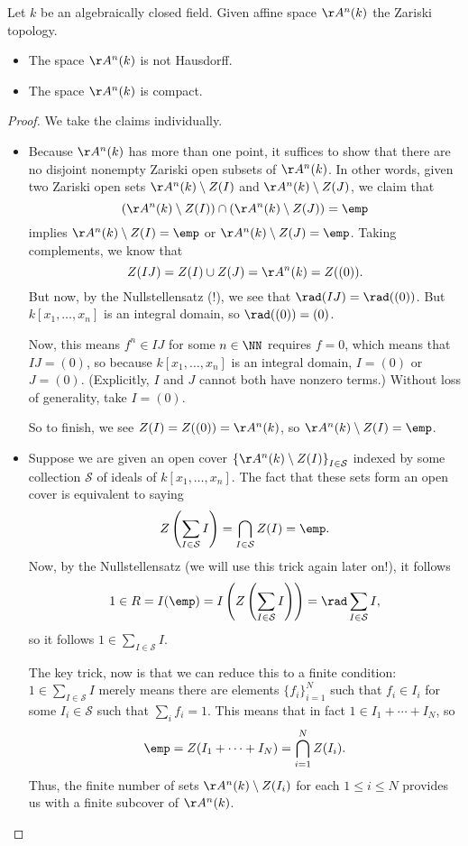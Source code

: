 \begin{proposition}
	Let $k$ be an algebraically closed field. Given affine space $\AA^n(k)$ the Zariski topology.
	\begin{itemize}
		\item The space $\AA^n(k)$ is not Hausdorff.
		\item The space $\AA^n(k)$ is compact.
	\end{itemize}
\end{proposition}
\begin{proof}
	We take the claims individually.
	\begin{itemize}
		\item Because $\AA^n(k)$ has more than one point, it suffices to show that there are no disjoint nonempty Zariski open subsets of $\AA^n(k)$. In other words, given two Zariski open sets $\AA^n(k)\setminus Z(I)$ and $\AA^n(k)\setminus Z(J)$, we claim that
		\[\left(\AA^n(k)\setminus Z(I)\right)\cap\left(\AA^n(k)\setminus Z(J)\right)=\emp\]
		implies $\AA^n(k)\setminus Z(I)=\emp$ or $\AA^n(k)\setminus Z(J)=\emp$. Taking complements, we know that
		\[Z(IJ)=Z(I)\cup Z(J)=\AA^n(k)=Z((0)).\]
		But now, by the Nullstellensatz (!), we see that $\rad(IJ)=\rad((0))$. But $k[x_1,\ldots,x_n]$ is an integral domain, so $\rad((0))=(0)$.
		
		Now, this means $f^n\in IJ$ for some $n\in\NN$ requires $f=0$, which means that $IJ=(0)$, so because $k[x_1,\ldots,x_n]$ is an integral domain, $I=(0)$ or $J=(0)$. (Explicitly, $I$ and $J$ cannot both have nonzero terms.) Without loss of generality, take $I=(0)$.

		So to finish, we see $Z(I)=Z((0))=\AA^n(k)$, so $\AA^n(k)\setminus Z(I)=\emp$.
		\item Suppose we are given an open cover $\left\{\AA^n(k)\setminus Z(I)\right\}_{I\in\mathcal S}$ indexed by some collection $\mathcal S$ of ideals of $k[x_1,\ldots,x_n]$. The fact that these sets form an open cover is equivalent to saying
		\[Z\left(\sum_{I\in\mathcal S}I\right)=\bigcap_{I\in\mathcal S}Z(I)=\emp.\]
		Now, by the Nullstellensatz (we will use this trick again later on!), it follows
		\[1\in R=I(\emp)=I\left(Z\left(\sum_{I\in\mathcal S} I\right)\right)=\rad\sum_{I\in\mathcal S} I,\]
		so it follows $1\in\sum_{I\in\mathcal S} I$.

		The key trick, now is that we can reduce this to a finite condition: $1\in\sum_{I\in\mathcal S}I$ merely means there are elements $\{f_i\}_{i=1}^N$ such that $f_i\in I_i$ for some $I_i\in\mathcal S$ such that $\sum_if_i=1$. This means that in fact $1\in I_1+\cdots+I_N$, so
		\[\emp=Z(I_1+\cdots+I_N)=\bigcap_{i=1}^NZ(I_i).\]
		Thus, the finite number of sets $\AA^n(k)\setminus Z(I_i)$ for each $1\le i\le N$ provides us with a finite subcover of $\AA^n(k)$.
		\qedhere
	\end{itemize}
\end{proof}
